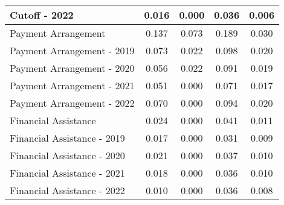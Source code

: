 \begin{tabular}{l|c|c|c|c}
\quad Cutoff - 2022 & 0.016 & 0.000 & 0.036 & 0.006 \\
\midrule 
Payment Arrangement & 0.137 & 0.073 & 0.189 & 0.030 \\
\quad Payment Arrangement - 2019 & 0.073 & 0.022 & 0.098 & 0.020 \\
\quad Payment Arrangement - 2020 & 0.056 & 0.022 & 0.091 & 0.019 \\
\quad Payment Arrangement - 2021 & 0.051 & 0.000 & 0.071 & 0.017 \\
\quad Payment Arrangement - 2022 & 0.070 & 0.000 & 0.094 & 0.020 \\
\midrule 
Financial Assistance & 0.024 & 0.000 & 0.041 & 0.011 \\
\quad Financial Assistance - 2019 & 0.017 & 0.000 & 0.031 & 0.009 \\
\quad Financial Assistance - 2020 & 0.021 & 0.000 & 0.037 & 0.010 \\
\quad Financial Assistance - 2021 & 0.018 & 0.000 & 0.036 & 0.010 \\
\quad Financial Assistance - 2022 & 0.010 & 0.000 & 0.036 & 0.008 \\
\midrule 
\bottomrule 
\end{tabular}
